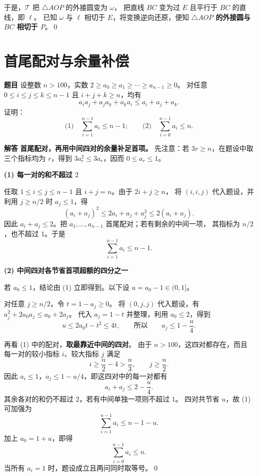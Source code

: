 \documentclass[UTF8,11pt,fontset=fandol]{ctexart}
\numberwithin{equation}{section}
\newcommand{\problem}{\noindent\textbf{题目\quad}}
\newcommand{\solution}{\par\medskip\noindent\textbf{解答\quad}}
\newcommand{\step}[1]{\par\medskip\noindent\textbf{#1}\par}
\newcommand{\qedmark}{\qed\par}
\begin{document}
于是，$\mathcal T$ 把 $\triangle AOP$ 的外接圆变为 $\omega$，
把直线 $BC$ 变为过 $E$ 且平行于 $BC$ 的直线，即 $\ell$。
已知 $\omega$ 与 $\ell$ 相切于 $E$，将变换逆向还原，便知
\textbf{$\triangle AOP$ 的外接圆与 $BC$ 相切于 $P$}。\qedmark

\newpage
\section{首尾配对与余量补偿}
\problem
设整数 $n>100$，实数 $2\ge a_0\ge a_1\ge\cdots\ge a_{n-1}\ge0$。
对任意 $0\le i\le j\le k\le n-1$ 且 $i+j+k\ge n$，均有
\[
 a_i a_j+a_j a_k+a_k a_i\le a_i+a_j+a_k.
\]
证明：
\[
 \text{(1)}\quad \sum_{i=1}^{n-1}a_i\le n-1;
 \qquad
 \text{(2)}\quad \sum_{i=0}^{n-1}a_i\le n.
\]

\solution
\textbf{首尾配对，再用中间四对的余量补足首项。}
先注意：若 $3r\ge n$，在题设中取三个指标均为 $r$，得到
$3a_r^2\le3a_r$，因而 $0\le a_r\le1$。

\step{(1) 每一对的和不超过 $2$}
任取 $1\le i\le j\le n-1$ 且 $i+j=n$。由于 $2i+j\ge n$，
将 $(i,i,j)$ 代入题设，并利用 $j\ge n/2$ 时 $a_j\le1$，得
\[
 (a_i+a_j)^2
 \le 2a_i+a_j+a_j^2
 \le2(a_i+a_j).
\]
因此 $a_i+a_j\le2$。把 $a_1,\ldots,a_{n-1}$ 首尾配对；若有剩余的中间一项，
其指标为 $n/2$，也不超过 $1$。于是
\[
 \boxed{\sum_{i=1}^{n-1}a_i\le n-1}.
\]

\step{(2) 中间四对各节省首项超额的四分之一}
若 $a_0\le1$，结论由 (1) 立即得到。以下设 $u=a_0-1\in(0,1]$。

对任意 $j\ge n/2$，令 $t=1-a_j\ge0$。
将 $(0,j,j)$ 代入题设，有 $a_j^2+2a_0a_j\le a_0+2a_j$。
代入 $a_j=1-t$ 并整理，利用 $a_0\le2$，得到
\[
 u\le2a_0t-t^2\le4t,
 \qquad\text{所以}\qquad
 a_j\le1-\frac u4.
\]

再看 (1) 中的配对，\textbf{取最靠近中间的四对}。
由于 $n>100$，这四对都存在，而且每一对的较小指标 $i$、较大指标 $j$ 满足
\[
 i\ge\frac n2-4>\frac n3,\qquad j\ge\frac n2.
\]
因此 $a_i\le1$，$a_j\le1-u/4$，即这四对中的每一对都有
\[
 a_i+a_j\le 2-\frac u4.
\]
其余各对的和仍不超过 $2$，若有中间单独一项则不超过 $1$。
四对共节省 $u$，故 (1) 可加强为
\[
 \sum_{i=1}^{n-1}a_i\le n-1-u.
\]
加上 $a_0=1+u$，即得
\[
 \boxed{\sum_{i=0}^{n-1}a_i\le n}.
\]
当所有 $a_i=1$ 时，题设成立且两问同时取等号。\qedmark

\newpage
\end{document}
